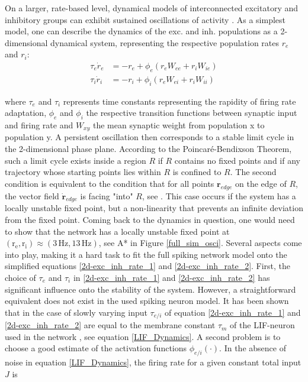 \documentclass[10pt,a4paper]{article}
\begin{document}
On a larger, rate-based level, dynamical models of interconnected excitatory and inhibitory groups can exhibit sustained oscillations of activity \cite[p.~270]{Theor_Neur_Dayan}. As a simplest model, one can describe the dynamics of the exc. and inh. populations as a 2-dimensional dynamical system, representing the respective population rates $r_e$ and $r_i$:
\begin{align}
\tau_e \dot{r}_e  &= -r_e + \phi_e(r_e W_{ee} + r_i W_{ie}) \label{2d-exc_inh_rate_1} \\
\tau_i \dot{r}_i  &= -r_i + \phi_i(r_e W_{ei} + r_i W_{ii}) \label{2d-exc_inh_rate_2}
\end{align}

where $\tau_e$ and $\tau_i$ represents time constants representing the rapidity of firing rate adaptation, $\phi_e$ and $\phi_i$ the respective transition functions between synaptic input and firing rate and $W_{xy}$ the mean synaptic weight from population x to population y. A persistent oscillation then corresponds to a stable limit cycle in the 2-dimensional phase plane. According to the Poincaré-Bendixson Theorem, such a limit cycle exists inside a region $R$ if $R$ contains no fixed points and if any trajectory whose starting points lies within $R$ is confined to $R$. The second condition is equivalent to the condition that for all points $\mathbf{r}_{edge}$ on the edge of $R$, the vector field $\dot{\mathbf{r}}_{edge}$ is facing "into" $R$, see \cite[p.~248]{Dyn_Sys_Hirsch}. This case occurs if the system has a locally unstable fixed point, but a non-linearity that prevents an infinite deviation from the fixed point.
Coming back to the dynamics in question, one would need to show that the network has a locally unstable fixed point at $\mathrm{(r_e,r_i)\approx (3\, Hz, 13\, Hz)}$, see A* in Figure \ref{full_sim_osci}. Several aspects come into play, making it a hard task to fit the full spiking network model onto the simplified equations \ref{2d-exc_inh_rate_1} and \ref{2d-exc_inh_rate_2}. First, the choice of $\tau_e$ and $\tau_i$ in \ref{2d-exc_inh_rate_1} and \ref{2d-exc_inh_rate_2} has significant influence onto the stability of the system. However, a straightforward equivalent does not exist in the used spiking neuron model. It has been shown that in the case of slowly varying input $\tau_{e/i}$ of equation \ref{2d-exc_inh_rate_1} and \ref{2d-exc_inh_rate_2} are equal to the membrane constant $\tau_m$ of the LIF-neuron used in the network \cite{Gerstner_Pop_Act}, see equation \ref{LIF_Dynamics}. A second problem is to choose a good estimate of the activation functions $\phi_{e/i}( \cdot )$. In the absence of noise in equation \ref{LIF_Dynamics}, the firing rate for a given constant total input $J$ is
\end{document}
